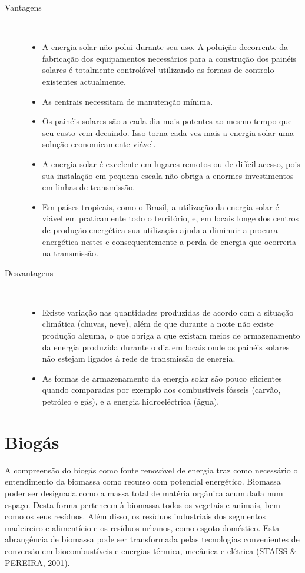 \begin{description}
	\item [Vantagens] \

	\begin{itemize}
		\item A energia solar não polui durante seu uso. A poluição decorrente da fabricação dos equipamentos necessários para a construção dos painéis solares é totalmente controlável utilizando as formas de controlo existentes actualmente.
		\item As centrais necessitam de manutenção mínima.
		\item Os painéis solares são a cada dia mais potentes ao mesmo tempo que seu custo vem decaindo. Isso torna cada vez mais a energia solar uma solução economicamente viável.
		\item A energia solar é excelente em lugares remotos ou de difícil acesso, pois sua instalação em pequena escala não obriga a enormes investimentos em linhas de transmissão.
		\item Em países tropicais, como o Brasil, a utilização da energia solar é viável em praticamente todo o território, e, em locais longe dos centros de produção energética sua utilização ajuda a diminuir a procura energética nestes e consequentemente a perda de energia que ocorreria na transmissão.
	\end{itemize}

	\item [Desvantagens] \

	\begin{itemize}
		\item Existe variação nas quantidades produzidas de acordo com a situação climática (chuvas, neve), além de que durante a noite não existe produção alguma, o que obriga a que existam meios de armazenamento da energia produzida durante o dia em locais onde os painéis solares não estejam ligados à rede de transmissão de energia.
		\item As formas de armazenamento da energia solar são pouco eficientes quando comparadas por exemplo aos combustíveis fósseis (carvão, petróleo e gás), e a energia hidroeléctrica (água).
	\end{itemize}
\end{description}

\section{Biogás}
A compreensão do biogás como fonte renovável de energia traz como necessário o entendimento da biomassa como recurso com potencial energético. Biomassa poder ser designada como a massa total de matéria orgânica acumulada num espaço. Desta forma pertencem à biomassa todos os vegetais e animais, bem como os seus resíduos. Além disso, os resíduos industriais dos segmentos madeireiro e alimentício e os resíduos urbanos, como esgoto doméstico. Esta abrangência de biomassa pode ser transformada pelas tecnologias convenientes de conversão em biocombustíveis e energias térmica, mecânica e elétrica (STAISS \& PEREIRA, 2001).

